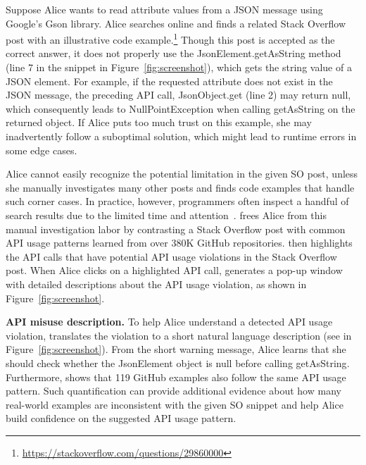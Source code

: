 Suppose Alice wants to read attribute values from a {\ttt JSON} message using Google's Gson library. Alice searches online and finds a related Stack Overflow post with an illustrative code example.\footnote{\url{https://stackoverflow.com/questions/29860000}} Though this post is accepted as the correct answer, it does not properly use the {\ttt JsonElement.getAsString} method (line 7 in the snippet in Figure~\ref{fig:screenshot}), which gets the {\ttt string} value of a {\ttt JSON} element. For example, if the requested attribute does not exist in the {\ttt JSON} message, the preceding API call, {\ttt JsonObject.get} (line 2) may return {\ttt null}, which consequently leads to {\ttt NullPointException} when calling {\ttt getAsString} on the returned object. If Alice puts too much trust on this example, she may inadvertently follow a suboptimal solution, which might lead to runtime errors in some edge cases. 

Alice cannot easily recognize the potential limitation in the given SO post, unless she manually investigates many other posts and finds code examples that handle such corner cases. In practice, however, programmers often inspect a handful of search results due to the limited time and attention~\cite{brandt2009two, starke2009working}. {\tool} frees Alice from this manual investigation labor by contrasting a Stack Overflow post with common API usage patterns learned from over 380K GitHub repositories. {\tool} then highlights the API calls that have potential API usage violations in the Stack Overflow post. When Alice clicks on a highlighted API call, {\tool} generates a pop-up window with detailed descriptions about the API usage violation, as shown in Figure~\ref{fig:screenshot}.

{\bf API misuse description.} To help Alice understand a detected API usage violation, {\tool} translates the violation to a short natural language description (see  in Figure~\ref{fig:screenshot}). From the short warning message, Alice learns that she should check whether the {\ttt JsonElement} object is {\ttt null} before calling {\ttt getAsString}. Furthermore, {\tool} shows that 119 GitHub examples also follow the same API usage pattern. Such quantification can provide additional evidence about how many real-world examples are inconsistent with the given SO snippet and help Alice build confidence on the suggested API usage pattern.

